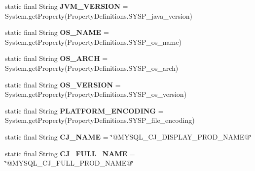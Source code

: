 \begin{DoxyCompactItemize}
\item 
\mbox{\label{classcom_1_1mysql_1_1cj_1_1_constants_a776cda170b97e4dd81cade47a4f17437}} 
static final String {\bfseries J\+V\+M\+\_\+\+V\+E\+R\+S\+I\+ON} = System.\+get\+Property(Property\+Definitions.\+S\+Y\+S\+P\+\_\+java\+\_\+version)
\item 
\mbox{\label{classcom_1_1mysql_1_1cj_1_1_constants_ace66e5c19e425e7546de210a129720ee}} 
static final String {\bfseries O\+S\+\_\+\+N\+A\+ME} = System.\+get\+Property(Property\+Definitions.\+S\+Y\+S\+P\+\_\+os\+\_\+name)
\item 
\mbox{\label{classcom_1_1mysql_1_1cj_1_1_constants_ab856418642fd10aa0794159a27cb2e9e}} 
static final String {\bfseries O\+S\+\_\+\+A\+R\+CH} = System.\+get\+Property(Property\+Definitions.\+S\+Y\+S\+P\+\_\+os\+\_\+arch)
\item 
\mbox{\label{classcom_1_1mysql_1_1cj_1_1_constants_ad1f1e8ee9d3e10a57303e73dc35df668}} 
static final String {\bfseries O\+S\+\_\+\+V\+E\+R\+S\+I\+ON} = System.\+get\+Property(Property\+Definitions.\+S\+Y\+S\+P\+\_\+os\+\_\+version)
\item 
\mbox{\label{classcom_1_1mysql_1_1cj_1_1_constants_a52bb2534146e4771d2efc27419e1e17f}} 
static final String {\bfseries P\+L\+A\+T\+F\+O\+R\+M\+\_\+\+E\+N\+C\+O\+D\+I\+NG} = System.\+get\+Property(Property\+Definitions.\+S\+Y\+S\+P\+\_\+file\+\_\+encoding)
\item 
\mbox{\label{classcom_1_1mysql_1_1cj_1_1_constants_a4f4a6063380597d03c4ff19e5efdd3e6}} 
static final String {\bfseries C\+J\+\_\+\+N\+A\+ME} = \char`\"{}@M\+Y\+S\+Q\+L\+\_\+\+C\+J\+\_\+\+D\+I\+S\+P\+L\+A\+Y\+\_\+\+P\+R\+O\+D\+\_\+\+N\+A\+ME@\char`\"{}
\item 
\mbox{\label{classcom_1_1mysql_1_1cj_1_1_constants_aaa6a79904f228b32972bf84513000f5e}} 
static final String {\bfseries C\+J\+\_\+\+F\+U\+L\+L\+\_\+\+N\+A\+ME} = \char`\"{}@M\+Y\+S\+Q\+L\+\_\+\+C\+J\+\_\+\+F\+U\+L\+L\+\_\+\+P\+R\+O\+D\+\_\+\+N\+A\+ME@\char`\"{}

\end{DoxyCompactItemize}
